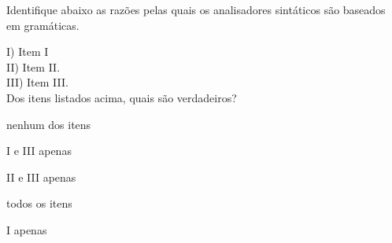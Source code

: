 \question[10]

Identifique abaixo as razões pelas quais os analisadores sintáticos são
baseados em gramáticas.

I) Item I\\
II) Item II.\\
III) Item III.\\

Dos itens listados acima, quais são verdadeiros?\\

\begin{choices}
\item nenhum dos itens
\item I e III apenas
\item II e III apenas
\item todos os itens %
\item I apenas
\end{choices}
\answerline


